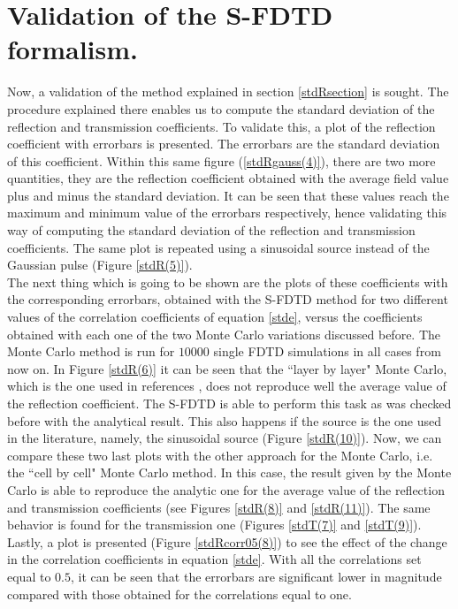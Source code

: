 \documentclass[12pt, oneside]{book}
\begin{document}
\section{Validation of the S-FDTD formalism.}
Now, a validation of the method explained in section \ref{stdRsection} is sought. The procedure explained there enables us to compute the standard deviation of the reflection and transmission coefficients. To validate this, a plot of the reflection coefficient with errorbars is presented. The errorbars are the standard deviation of this coefficient. Within this same figure (\ref{stdRgauss(4)}), there are two more quantities, they are the reflection coefficient obtained with the average field value plus and minus the standard deviation. It can be seen that these values reach the maximum and minimum value of the errorbars respectively, hence validating this way of computing the standard deviation of the reflection and transmission coefficients. The same plot is repeated using a sinusoidal source instead of the Gaussian pulse (Figure \ref{stdR(5)}). \\
\indent The next thing which is going to be shown are the plots of these coefficients with the corresponding errorbars, obtained with the S-FDTD method for two different values of the correlation coefficients of equation \ref{stde}, versus the coefficients obtained with each one of the two Monte Carlo variations discussed before. The Monte Carlo method is run for $10000$ single FDTD simulations in all cases from now on. In Figure \ref{stdR(6)} it can be seen that the ``layer by layer" Monte Carlo, which is the one used in references \cite{smith2011stochastic,smith2012stochastic}, does not reproduce well the average value of the reflection coefficient. The S-FDTD  is able to perform this task as was checked before with the analytical result. This also happens if the source is the one used in the literature, namely, the sinusoidal source (Figure \ref{stdR(10)}). Now, we can compare these two last plots with the other approach for the Monte Carlo, i.e. the ``cell by cell" Monte Carlo method. In this case, the result given by the Monte Carlo is able to reproduce the analytic one for the average value of the reflection and transmission coefficients (see Figures \ref{stdR(8)} and \ref{stdR(11)}). The same behavior is found for the transmission one (Figures \ref{stdT(7)} and \ref{stdT(9)}). \\
\indent Lastly, a plot is presented (Figure \ref{stdRcorr05(8)})  to see the effect of the change in the correlation coefficients in equation \ref{stde}. With all the correlations set equal to $0.5$, it can be seen that the errorbars are significant lower in magnitude compared with those obtained for the correlations equal to one.
\end{document}
